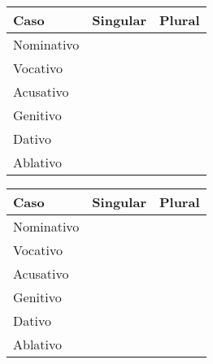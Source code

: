 \documentclass[12pt, twocolumn, a4paper, article]{article}
\numberwithin{equation}{section}
\begin{document}
\begin{table}
\centering
\begin{tabular}[!ht]{|l|p{2.5cm}|p{2.5cm}|} 
\hline \hline
Caso & \multicolumn{1}{c|}{Singular} & \multicolumn{1}{c|}{Plural}  \\
\hline
Nominativo &  & \\ \hline
Vocativo   &  & \\ \hline
Acusativo  &  & \\ \hline
Genitivo   &  & \\ \hline
Dativo     &  & \\ \hline
Ablativo   &  & \\
\hline \hline
\end{tabular}
\end{table}

\begin{table}
\centering
\begin{tabular}[!ht]{|l|p{2.5cm}|p{2.5cm}|} 
\hline \hline
Caso & \multicolumn{1}{c|}{Singular} & \multicolumn{1}{c|}{Plural}  \\
\hline
Nominativo &  & \\ \hline
Vocativo   &  & \\ \hline
Acusativo  &  & \\ \hline
Genitivo   &  & \\ \hline
Dativo     &  & \\ \hline
Ablativo   &  & \\
\hline \hline
\end{tabular}
\end{table}

\end{document}
